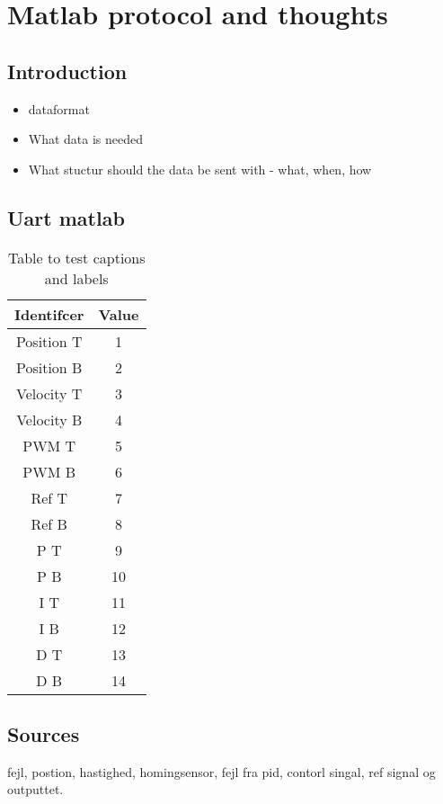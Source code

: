 \documentclass[../main]{subfiles}
\begin{document}
\section*{Matlab protocol and thoughts}

\subsection*{Introduction}


\begin{itemize}
  \item dataformat
  \item What data is needed
  \item What stuctur should the data be sent with - what, when, how
\end{itemize}

\subsection*{Uart matlab}

\begin{table}[h!]
\centering
\begin{tabular}{|c||c|}
 \hline
 Identifcer & Value \\
 \hline
 Position T & 1  \\
 Position B & 2  \\
 Velocity T & 3  \\
 Velocity B & 4  \\
 PWM T & 5 \\
 PWM B & 6 \\
 Ref T & 7 \\
 Ref B & 8 \\
 P T & 9 \\
 P B & 10 \\
 I T & 11 \\
 I B & 12 \\
 D T & 13 \\
 D B & 14 \\ [1ex]
 \hline
\end{tabular}
\caption{Table to test captions and labels}
\label{table:1}
\end{table}



\subsection{Sources}

fejl, postion, hastighed, homingsensor, fejl fra pid, contorl singal, ref signal og outputtet.
\end{document}
